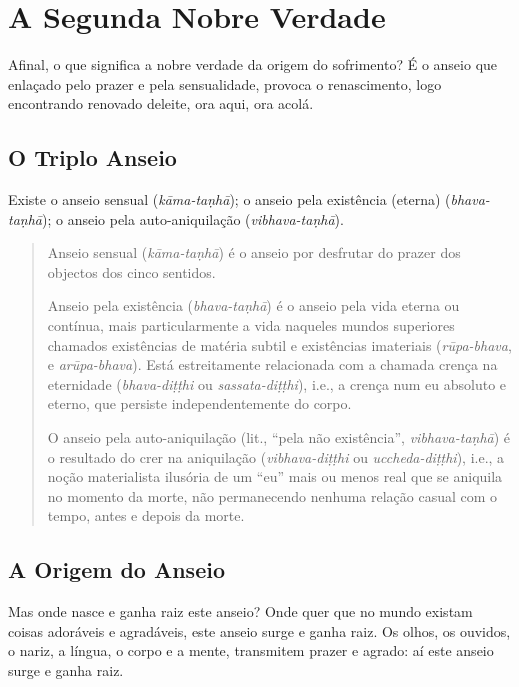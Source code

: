 
\chapter{A Segunda Nobre Verdade}


Afinal, o que significa a nobre verdade da origem do sofrimento? É o anseio que enlaçado pelo prazer e pela sensualidade, provoca o renascimento, logo encontrando renovado deleite, ora aqui, ora acolá.

\section{O Triplo Anseio}

Existe o anseio sensual (\emph{kāma-taṇhā}); o anseio pela existência (eterna) (\emph{bhava-taṇhā}); o anseio pela auto-aniquilação (\emph{vibhava-taṇhā}).


\begin{quote}
Anseio sensual (\emph{kāma-ta\d{n}hā}) é o anseio por desfrutar do
prazer dos objectos dos cinco sentidos.

Anseio pela existência (\emph{bhava-ta\d{n}hā}) é o anseio pela vida eterna ou
contínua, mais particularmente a vida naqueles mundos superiores chamados
existências de matéria subtil e existências imateriais (\emph{rūpa-bhava}, e
\emph{arūpa-bhava}). Está estreitamente relacionada com a chamada crença na
eternidade (\emph{bhava-di\d{t}\d{t}hi} ou \emph{sassata-di\d{t}\d{t}hi}), i.e.,
a crença num eu absoluto e eterno, que persiste independentemente do corpo.

O anseio pela auto-aniquilação (lit., ``pela não existência'',
\emph{vibhava-ta\d{n}hā}) é o resultado do crer na aniquilação
(\emph{vibhava-di\d{t}\d{t}hi} ou \emph{uccheda-di\d{t}\d{t}hi}), i.e., a noção
materialista ilusória de um ``eu'' mais ou menos real que se aniquila no momento
da morte, não permanecendo nenhuma relação casual com o tempo, antes e depois da
morte.
\end{quote}

\section{A Origem do Anseio}

Mas onde nasce e ganha raiz este anseio? Onde quer que no mundo existam coisas
adoráveis e agradáveis, este anseio surge e ganha raiz. Os olhos, os ouvidos, o
nariz, a língua, o corpo e a mente, transmitem prazer e agrado: aí este anseio
surge e ganha raiz.

